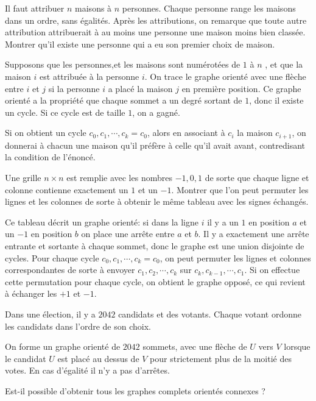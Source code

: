 \begin{exo}
Il faut attribuer $n$ maisons à $n$ personnes. Chaque personne range les maisons dans un ordre, sans égalités. Après les attributions, on remarque que toute autre attribution attribuerait à au moins une personne une maison moins bien classée. Montrer qu'il existe une personne qui a eu son premier choix de maison.
\end{exo}


\begin{sol}
Supposons que les personnes,et les maisons sont numérotées de $1$ à $n$ , et que la maison $i$ est attribuée à la personne $i$. On trace le graphe orienté avec une flèche entre $i$ et $j$ si la personne $i$ a placé la maison $j$ en première position. Ce graphe orienté a la propriété que chaque sommet a un degré sortant de $1$, donc il existe un cycle. Si ce cycle est de taille $1$, on a gagné.

\medskip

Si on obtient un cycle $c_0,c_1,\cdots,c_k=c_0$, alors en associant à $c_i$ la maison $c_{i+1}$, on donnerai à chacun une maison qu'il préfère à celle qu'il avait avant, contredisant la condition de l'énoncé.
\end{sol}

\begin{exo}
Une grille $n\times n$ est remplie avec les nombres $-1,0,1$ de sorte que chaque ligne et colonne contienne exactement un $1$ et un $-1$. Montrer que l'on peut permuter les lignes et les colonnes de sorte à obtenir le même tableau avec les signes échangés.
\end{exo}

\begin{sol}
Ce tableau décrit un graphe orienté: si dans la ligne $i$ il y a un $1$ en position $a$ et un $-1$ en position $b$ on place une arrête entre $a$ et $b$. Il y a exactement une arrête entrante et sortante à chaque sommet, donc le graphe est une union disjointe de cycles. Pour chaque cycle $c_0,c_1,\cdots,c_k=c_0$, on peut permuter les lignes et colonnes correspondantes de sorte à envoyer $c_1,c_2,\cdots, c_k$ sur $c_k,c_{k-1},\cdots,c_1$. Si on effectue cette permutation pour chaque cycle, on obtient le graphe opposé, ce qui revient à échanger les $+1$ et $-1$.
\end{sol}

\begin{exo}
Dans une élection, il y a $2042$ candidats et des votants. Chaque votant ordonne les candidats dans l'ordre de son choix.

On forme un graphe orienté de $2042$ sommets, avec une flèche de $U$ vers $V$ lorsque le candidat $U$ est placé au dessus de $V$ pour strictement plus de la moitié des votes. En cas d'égalité il n'y a pas d'arrêtes.

Est-il possible d'obtenir tous les graphes complets orientés connexes ?
\end{exo}

